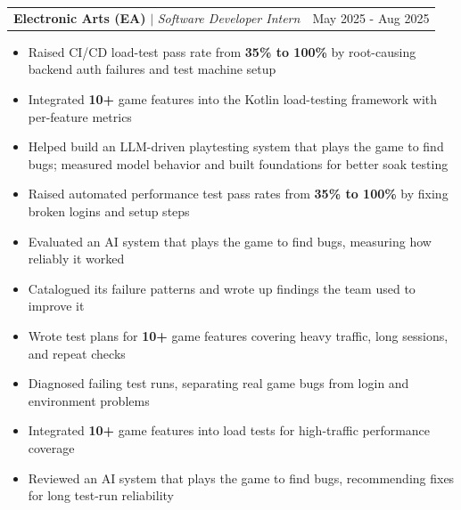 \documentclass[letterpaper,10pt]{article}
\makeatletter
\newcommand{\resumeItem}[1]{
  \item\normalsize{
    {#1 \vspace{0pt}}
  }
}
\newcommand{\resumeSubheading}[3]{
    \item
    \begin{tabular*}{0.97\textwidth}[t]{l@{\extracolsep{\fill}}r}
      \textbf{#1} $|$ \textit{ #2} & #3 \\
    \end{tabular*}\vspace{-2pt}
}
\newcommand{\resumeItemListStart}{\begin{itemize}[topsep=2pt, itemsep=1pt, parsep=0pt, partopsep=0pt]}
\newcommand{\resumeItemListEnd}{\end{itemize}\vspace{0pt}}
\makeatother
\begin{document}
    \resumeSubheading{Electronic Arts (EA)}{Software Developer Intern}{May 2025 - Aug 2025}
        \resumeItemListStart
            \ifdefined\flagSWE
            \resumeItem{Raised CI/CD load-test pass rate from \textbf{35\% to 100\%} by root-causing backend auth failures and test machine setup}
            \resumeItem{Integrated \textbf{10+} game features into the Kotlin load-testing framework with per-feature metrics}
            \resumeItem{Helped build an LLM-driven playtesting system that plays the game to find bugs; measured model behavior and built foundations for better soak testing}
            \else
            \resumeItem{Raised automated performance test pass rates from \textbf{35\% to 100\%} by fixing broken logins and setup steps}
            \fi
            \ifdefined\flagSWE
            \else
              \ifdefined\flagAIML
              \resumeItem{Evaluated an AI system that plays the game to find bugs, measuring how reliably it worked}
              \resumeItem{Catalogued its failure patterns and wrote up findings the team used to improve it}
              \else\ifdefined\flagQA
              \resumeItem{Wrote test plans for \textbf{10+} game features covering heavy traffic, long sessions, and repeat checks}
              \resumeItem{Diagnosed failing test runs, separating real game bugs from login and environment problems}
              \else
              \resumeItem{Integrated \textbf{10+} game features into load tests for high-traffic performance coverage}
              \resumeItem{Reviewed an AI system that plays the game to find bugs, recommending fixes for long test-run reliability}
              \fi\fi
            \fi
        \resumeItemListEnd
\end{document}
